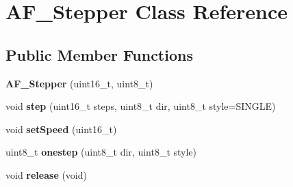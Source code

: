 \hypertarget{class_a_f___stepper}{}\section{A\+F\+\_\+\+Stepper Class Reference}
\label{class_a_f___stepper}
\subsection*{Public Member Functions}
\begin{DoxyCompactItemize}
\item 
{\bfseries A\+F\+\_\+\+Stepper} (uint16\+\_\+t, uint8\+\_\+t)\hypertarget{class_a_f___stepper_a30d87c3f618386a1bb82edf4bb413284}{}\label{class_a_f___stepper_a30d87c3f618386a1bb82edf4bb413284}

\item 
void {\bfseries step} (uint16\+\_\+t steps, uint8\+\_\+t dir, uint8\+\_\+t style=S\+I\+N\+G\+LE)\hypertarget{class_a_f___stepper_a6db3c09ff4cbffe5ec28ba88aa047147}{}\label{class_a_f___stepper_a6db3c09ff4cbffe5ec28ba88aa047147}

\item 
void {\bfseries set\+Speed} (uint16\+\_\+t)\hypertarget{class_a_f___stepper_a639184c6a8c7e1e33478240d30191a3a}{}\label{class_a_f___stepper_a639184c6a8c7e1e33478240d30191a3a}

\item 
uint8\+\_\+t {\bfseries onestep} (uint8\+\_\+t dir, uint8\+\_\+t style)\hypertarget{class_a_f___stepper_ac3b1ffd61acd6303b941e2a180ab8f51}{}\label{class_a_f___stepper_ac3b1ffd61acd6303b941e2a180ab8f51}

\item 
void {\bfseries release} (void)\hypertarget{class_a_f___stepper_a8903682d46b5e28c2b5e71c65ceffa27}{}\label{class_a_f___stepper_a8903682d46b5e28c2b5e71c65ceffa27}

\end{DoxyCompactItemize}
